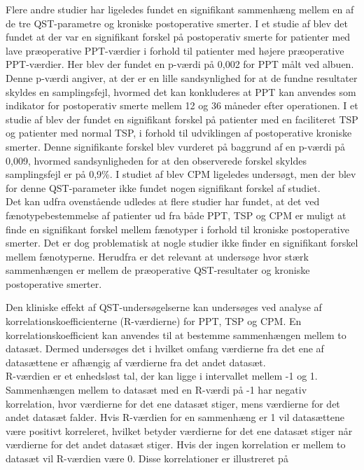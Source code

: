 Flere andre studier har ligeledes fundet en signifikant sammenhæng mellem en af de tre QST-parametre og kroniske postoperative smerter. \citep{Wylde2013} \citep{Wright2015} I et studie af  blev det fundet at der var en signifikant forskel på postoperativ smerte for patienter med lave præoperative PPT-værdier i forhold til patienter med højere præoperative PPT-værdier. Her blev der fundet en p-værdi på 0,002 for PPT målt ved albuen. Denne p-værdi angiver, at der er en lille sandsynlighed for at de fundne resultater skyldes en samplingsfejl, hvormed det kan konkluderes at PPT kan anvendes som indikator for postoperativ smerte mellem 12 og 36 måneder efter operationen. \citep{Wright2015} I et studie af  blev der fundet en signifikant forskel på patienter med en faciliteret TSP og patienter med normal TSP, i forhold til udviklingen af postoperative kroniske smerter. Denne signifikante forskel blev vurderet på baggrund af en p-værdi på 0,009, hvormed sandsynligheden for at den observerede forskel skyldes samplingsfejl er på 0,9\%. I studiet af  blev CPM ligeledes undersøgt, men der blev for denne QST-parameter ikke fundet nogen signifikant forskel af studiet. \citep{Petersen2015} \\
Det kan udfra ovenstående udledes at flere studier har fundet, at det ved fænotypebestemmelse af patienter ud fra både PPT, TSP og CPM er muligt at finde en signifikant forskel mellem fænotyper i forhold til kroniske postoperative smerter. Det er dog problematisk at nogle studier ikke finder en signifikant forskel mellem fænotyperne. \citep{Leary2016} Herudfra er det relevant at undersøge hvor stærk sammenhængen er mellem de præoperative QST-resultater og kroniske postoperative smerter.   

Den kliniske effekt af QST-undersøgelserne kan undersøges ved analyse af korrelationskoefficienterne (R-værdierne) for PPT, TSP og CPM. En korrelationskoefficient kan anvendes til at bestemme sammenhængen mellem to datasæt. Dermed undersøges det i hvilket omfang værdierne fra det ene af datasættene er afhængig af værdierne fra det andet datasæt. \citep{Zar2010} \\
R-værdien er et enhedsløst tal, der kan ligge i intervallet mellem -1 og 1. Sammenhængen mellem to datasæt med en R-værdi på -1 har negativ korrelation, hvor værdierne for det ene datasæt stiger, mens værdierne for det andet datasæt falder. Hvis R-værdien for en sammenhæng er 1 vil datasættene være positivt korreleret, hvilket betyder værdierne for det ene datasæt stiger når værdierne for det andet datasæt stiger. Hvis der ingen korrelation er mellem to datasæt vil R-værdien være 0. \citep{Zar2010} Disse korrelationer er illustreret på 

